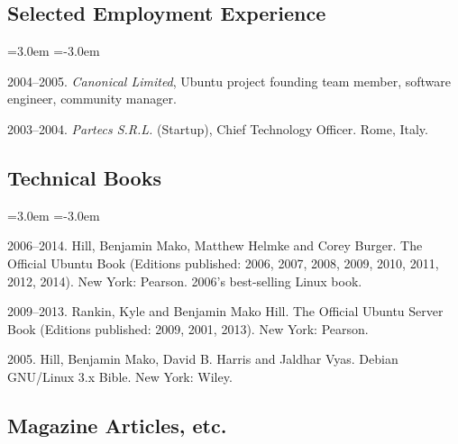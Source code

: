 \documentclass[10pt]{article}
\newenvironment{cvlist}{
\begin{list}{}{\leftmargin=3.0em \itemindent=-3.0em}
  \setlength{\itemsep}{0pt}
  \setlength{\parskip}{0em}
  \setlength{\parsep}{1em}
  \setlength{\parindent}{0em}}
{\vspace{1em}
\end{list}}
\begin{document}
\subsection{Selected Employment Experience}
\begin{cvlist}
\item 2004--2005. \emph{Canonical Limited}, Ubuntu project founding team member, software engineer, community manager.
\item 2003--2004. \emph{Partecs S.R.L.} (Startup), Chief Technology Officer. Rome, Italy.
\end{cvlist}

\subsection{Technical Books}
\begin{cvlist}
\item 2006--2014. Hill, Benjamin Mako, Matthew Helmke and Corey Burger. The Official Ubuntu Book (Editions published: 2006, 2007, 2008, 2009, 2010, 2011, 2012, 2014). New York: Pearson. 2006's best-selling Linux book.
\item 2009--2013. Rankin, Kyle and Benjamin Mako Hill. The Official Ubuntu Server Book (Editions published: 2009, 2001, 2013). New York: Pearson.
\item 2005. Hill, Benjamin Mako, David B. Harris and Jaldhar Vyas. Debian GNU/Linux 3.x Bible. New York: Wiley.
\end{cvlist}

\subsection{Magazine Articles, etc.}
\end{document}
